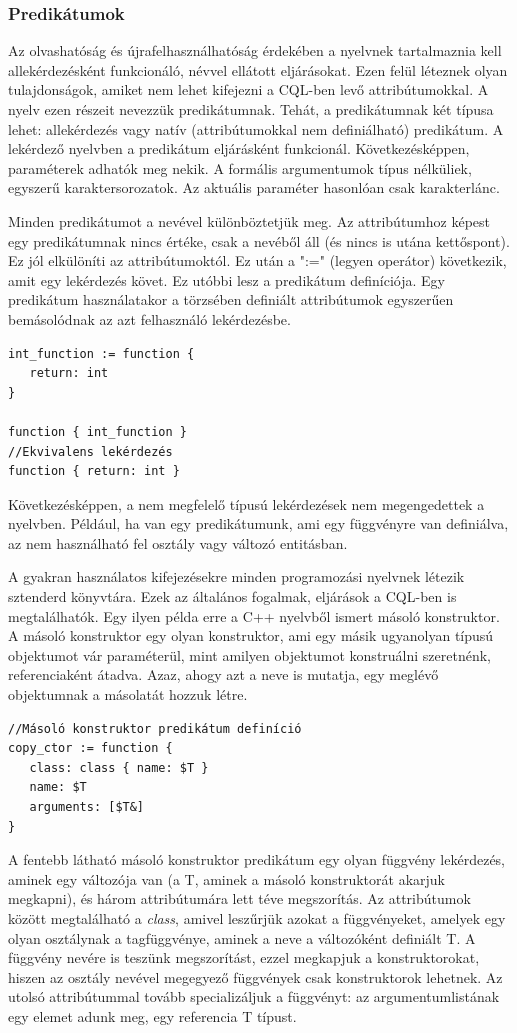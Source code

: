 \documentclass[a4paper,12pt]{report}
\begin{document}
\subsubsection{Predikátumok}
Az olvashatóság és újrafelhasználhatóság érdekében a nyelvnek tartalmaznia kell allekérdezésként funkcionáló, névvel ellátott eljárásokat. Ezen felül léteznek olyan tulajdonságok, amiket nem lehet kifejezni a CQL-ben levő attribútumokkal. A nyelv ezen részeit nevezzük predikátumnak. Tehát, a predikátumnak két típusa lehet: allekérdezés vagy natív (attribútumokkal nem definiálható) predikátum. A lekérdező nyelvben a predikátum eljárásként funkcionál. Következésképpen, paraméterek adhatók meg nekik. A formális argumentumok típus nélküliek, egyszerű karaktersorozatok. Az aktuális paraméter hasonlóan csak karakterlánc.
\par Minden predikátumot a nevével különböztetjük meg. Az attribútumhoz képest egy predikátumnak nincs értéke, csak a nevéből áll (és nincs is utána kettőspont). Ez jól elkülöníti az attribútumoktól. Ez után a ":=" (legyen operátor) következik, amit egy lekérdezés követ. Ez utóbbi lesz a predikátum definíciója. Egy predikátum használatakor a törzsében definiált attribútumok egyszerűen bemásolódnak az azt felhasználó lekérdezésbe.
\begin{verbatim}
int_function := function {
   return: int
}

function { int_function }  
//Ekvivalens lekérdezés
function { return: int } 
\end{verbatim}
\par Következésképpen, a nem megfelelő típusú lekérdezések nem megengedettek a nyelvben. Például, ha van egy predikátumunk, ami egy függvényre van definiálva, az nem használható fel osztály vagy változó entitásban.
\par A gyakran használatos kifejezésekre minden programozási nyelvnek létezik sztenderd könyvtára. Ezek az általános fogalmak, eljárások a CQL-ben is megtalálhatók. Egy ilyen példa erre a C++ nyelvből ismert másoló konstruktor. A másoló konstruktor egy olyan konstruktor, ami egy másik ugyanolyan típusú objektumot vár paraméterül, mint amilyen objektumot konstruálni szeretnénk, referenciaként átadva. Azaz, ahogy azt a neve is mutatja, egy meglévő objektumnak a másolatát hozzuk létre.
\begin{verbatim}
//Másoló konstruktor predikátum definíció
copy_ctor := function {
   class: class { name: $T }
   name: $T
   arguments: [$T&]
}
\end{verbatim}
\par A fentebb látható másoló konstruktor predikátum egy olyan függvény lekérdezés, aminek egy változója van (a T, aminek a másoló konstruktorát akarjuk megkapni), és három attribútumára lett téve megszorítás. Az attribútumok között megtalálható a \textit{class}, amivel leszűrjük azokat a függvényeket, amelyek egy olyan osztálynak a tagfüggvénye, aminek a neve a változóként definiált T. A függvény nevére is teszünk megszorítást, ezzel megkapjuk a konstruktorokat, hiszen az osztály nevével megegyező függvények csak konstruktorok lehetnek. Az utolsó attribútummal tovább specializáljuk a függvényt: az argumentumlistának egy elemet adunk meg, egy referencia T típust.
\end{document}
